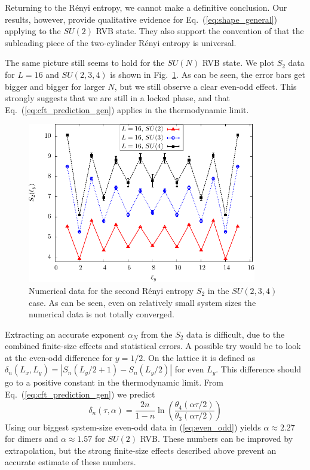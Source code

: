 \documentclass[11pt]{iopart}
\begin{document}
Returning to the R\'enyi entropy, we cannot make a definitive conclusion. Our results, however, provide qualitative evidence for  Eq.~(\ref{eq:shape_general}) applying to the $SU(2)$ RVB state. They also support the convention of \cite{Ju2012} that the subleading piece of the two-cylinder R\'enyi entropy is universal.


The same picture still seems to hold for the $SU(N)$ RVB state. We plot $S_2$ data for $L=16$ and $SU(2,3,4)$ is shown in Fig.~\ref{fig:SUN_shape}. As can be seen, the error bars get bigger and bigger for larger $N$, but we still observe a clear even-odd effect. This strongly suggests that we are still in a locked phase, and that Eq.~(\ref{eq:cft_prediction_gen}) applies in the thermodynamic limit. 
\begin{figure}[ht]
 \begin{center}
  \includegraphics[width=10cm]{./figures/SUN_shape.pdf}
 \end{center}
\caption{Numerical data for the second R\'enyi entropy $S_2$ in the $SU(2,3,4)$ case. As can be seen, even on relatively small system sizes the numerical data is not totally converged. }
\label{fig:SUN_shape}
\end{figure}


Extracting an accurate exponent $\alpha_N$ from the $S_2$ data is difficult, due to the combined finite-size effects and statistical errors. A possible try would be to  look at the even-odd difference for $y=1/2$. On the lattice it is defined as $\delta_n(L_x,L_y)=\left|S_n(L_y/2+1)-S_n(L_y/2)\right|$ for even $L_y$. This difference should go to a positive constant in the thermodynamic limit. From Eq.~(\ref{eq:cft_prediction_gen}) we predict
\begin{equation}\label{eq:even_odd}
 \delta_n(\tau,\alpha)=\frac{2n}{1-n}\ln \left(\frac{\theta_4(\alpha\tau/2)}{\theta_3(\alpha \tau/2)}\right)
\end{equation}
Using our biggest system-size even-odd data in (\ref{eq:even_odd}) yields $\alpha \approx 2.27$ for dimers and $\alpha \approx 1.57$ for $SU(2)$ RVB. These numbers can be improved by extrapolation, but the strong finite-size effects described above prevent an accurate estimate of these numbers.
\end{document}
